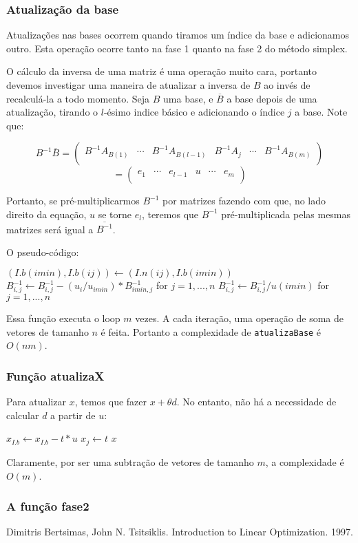 \documentclass[12pt]{article}
\begin{document}
\subsubsection{Atualização da base}
Atualizações nas bases ocorrem quando tiramos um índice da base e adicionamos outro. Esta operação ocorre tanto na fase 1 quanto na fase 2 do método simplex.

O cálculo da inversa de uma matriz é uma operação muito cara, portanto devemos investigar uma maneira de atualizar a inversa de $B$ ao invés de recalculá-la a todo momento. Seja $B$ uma base, e $\overline{B}$ a base depois de uma atualização, tirando o $l$-ésimo indice básico e adicionando o índice $j$ a base. Note que:
\begin{center}
$$
B^{-1}\overline{B} =
\begin{pmatrix}
B^{-1}A_{B(1)}  & \cdots & B^{-1}A_{B(l - 1)} & B^{-1}A_j & \cdots & B^{-1}A_{B(m)} \\    
\end{pmatrix}
$$
$$
=\begin{pmatrix}
e_1  & \cdots & e_{l-1} & u & \cdots & e_m \\    
\end{pmatrix}
$$
\end{center}
Portanto, se pré-multiplicarmos $B^{-1}$ por matrizes fazendo com que, no lado direito da equação, $u$ se torne $e_l$, teremos que $B^{-1}$ pré-multiplicada pelas mesmas matrizes será igual a $\overline{B^{-1}}$.

O pseudo-código:
\begin{algorithmic}
\State $(I.b(imin), I.b(ij)) \gets (I.n(ij), I.b(imin))$
		\State $B^{-1}_{i, j} \gets B^{-1}_{i, j} - (u_i / u_{imin}) * B^{-1}_{imin, j}$ for $j = 1, ..., n$
	\EndIf
\EndFor
\State $B^{-1}_{i, j} \gets B^{-1}_{i, j} / u(imin)$ for $j = 1, ..., n$
\EndFunction
\end{algorithmic}

Essa função executa o loop $m$ vezes. A cada iteração, uma operação de soma de vetores de tamanho $n$ é feita. Portanto a complexidade de \texttt{atualizaBase} é $O(nm)$.

\subsubsection{Função atualizaX}
Para atualizar $x$, temos que fazer $x + \theta d$. No entanto, não há a necessidade de calcular $d$ a partir de $u$:
\begin{algorithmic}
	\State $x_{I.b} \gets x_{I.b} - t * u$
	\State $x_j \gets t$
	\Return $x$
\EndFunction
\end{algorithmic}
Claramente, por ser uma subtração de vetores de tamanho $m$, a complexidade é $O(m)$.

\subsubsection{A função fase2}



\newpage


	

\newpage
\begin{thebibliography}{9}
 Dimitris Bertsimas, John N. Tsitsiklis. Introduction to Linear Optimization. 1997.
\end{thebibliography}
\end{document}
